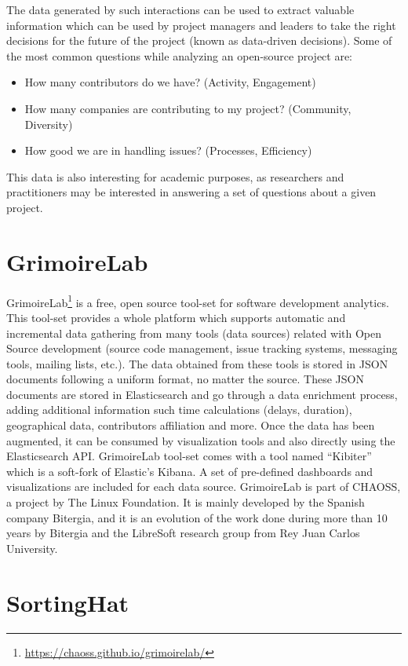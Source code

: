 \documentclass[a4paper, 12pt]{book}
\begin{document}
The data generated by such interactions can be used to extract valuable information which can be used by project managers and leaders to take the right decisions for the future of the project (known as data-driven decisions). Some of the most common questions while analyzing an open-source project are:

\begin{itemize}
    \item How many contributors do we have? (Activity, Engagement)
    \item How many companies are contributing to my project? (Community, Diversity)
    \item How good we are in handling issues? (Processes, Efficiency) 
\end{itemize}

This data is also interesting for academic purposes, as researchers and practitioners may be interested in answering a set of questions about a given project.

\section{GrimoireLab}

GrimoireLab\footnote{\url{https://chaoss.github.io/grimoirelab/}} is a free, open source tool-set for software development analytics.
This tool-set provides a whole platform which supports automatic and incremental data gathering from many tools (data sources) related with Open Source development (source code management, issue tracking systems, messaging tools, mailing lists, etc.).
The data obtained from these tools is stored in JSON documents following a uniform format, no matter the source. These JSON documents are stored in Elasticsearch and go through a data enrichment process, adding additional information such time calculations (delays, duration), geographical data, contributors affiliation and more.
Once the data has been augmented, it can be consumed by visualization tools and also directly using the Elasticsearch API. GrimoireLab tool-set comes with a tool named “Kibiter” which is a soft-fork of Elastic’s Kibana. A set of pre-defined dashboards and visualizations are included for each data source.  
GrimoireLab is part of CHAOSS, a project by The Linux Foundation. It is mainly developed by the Spanish company Bitergia, and it is an evolution of the work done during more than 10 years by Bitergia and the LibreSoft research group from Rey Juan Carlos University.

\section{SortingHat}
\end{document}
